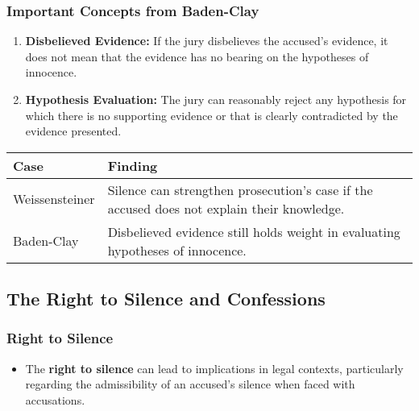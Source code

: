 \subsubsection{Important Concepts from
Baden-Clay}\label{important-concepts-from-baden-clay}

\begin{enumerate}
\def\labelenumi{\arabic{enumi}.}
\tightlist
\item
  \textbf{Disbelieved Evidence:} If the jury disbelieves the accused's
  evidence, it does not mean that the evidence has no bearing on the
  hypotheses of innocence.
\item
  \textbf{Hypothesis Evaluation:} The jury can reasonably reject any
  hypothesis for which there is no supporting evidence or that is
  clearly contradicted by the evidence presented.
\end{enumerate}

\begin{longtable}[]{@{}
  >{\raggedright\arraybackslash}p{}
  >{\raggedright\arraybackslash}p{}@{}}
\toprule\noalign{}
\begin{minipage}[b]{\linewidth}\raggedright
Case
\end{minipage} & \begin{minipage}[b]{\linewidth}\raggedright
Finding
\end{minipage} \\
\midrule\noalign{}
\endhead
\bottomrule\noalign{}
\endlastfoot
Weissensteiner & Silence can strengthen prosecution's case if the
accused does not explain their knowledge. \\
Baden-Clay & Disbelieved evidence still holds weight in evaluating
hypotheses of innocence. \\
\end{longtable}

\subsection{  The Right to Silence and
Confessions}\label{the-right-to-silence-and-confessions}

\subsubsection{Right to Silence}\label{right-to-silence-1}

\begin{itemize}
\tightlist
\item
  The \textbf{right to silence} can lead to implications in legal
  contexts, particularly regarding the admissibility of an accused's
  silence when faced with accusations.
\end{itemize}

